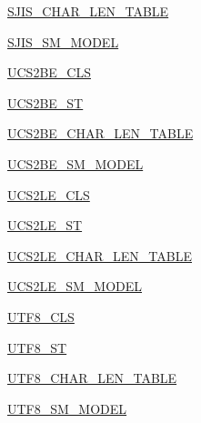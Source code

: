 \begin{DoxyCompactItemize}
\item 
\hyperlink{namespacepip_1_1__vendor_1_1chardet_1_1mbcssm_a4b210c653b5cd1244122fff7ee1a3c84}{S\+J\+I\+S\+\_\+\+C\+H\+A\+R\+\_\+\+L\+E\+N\+\_\+\+T\+A\+B\+LE}
\item 
\hyperlink{namespacepip_1_1__vendor_1_1chardet_1_1mbcssm_a49b66f6f6c37593e145ca2bf89a1dc3a}{S\+J\+I\+S\+\_\+\+S\+M\+\_\+\+M\+O\+D\+EL}
\item 
\hyperlink{namespacepip_1_1__vendor_1_1chardet_1_1mbcssm_a211a0901b4d0287631cb656380dde5c8}{U\+C\+S2\+B\+E\+\_\+\+C\+LS}
\item 
\hyperlink{namespacepip_1_1__vendor_1_1chardet_1_1mbcssm_af051a317c20a30a8e5635a4358c23b79}{U\+C\+S2\+B\+E\+\_\+\+ST}
\item 
\hyperlink{namespacepip_1_1__vendor_1_1chardet_1_1mbcssm_a02a14839f8338acb45bbbcbf9d5d03e1}{U\+C\+S2\+B\+E\+\_\+\+C\+H\+A\+R\+\_\+\+L\+E\+N\+\_\+\+T\+A\+B\+LE}
\item 
\hyperlink{namespacepip_1_1__vendor_1_1chardet_1_1mbcssm_abc91ee1869432d180060766560e91a7a}{U\+C\+S2\+B\+E\+\_\+\+S\+M\+\_\+\+M\+O\+D\+EL}
\item 
\hyperlink{namespacepip_1_1__vendor_1_1chardet_1_1mbcssm_a20af35b8e6ab83bbe931df039eaf190f}{U\+C\+S2\+L\+E\+\_\+\+C\+LS}
\item 
\hyperlink{namespacepip_1_1__vendor_1_1chardet_1_1mbcssm_ac92d38827a1d1313456617714b374ec9}{U\+C\+S2\+L\+E\+\_\+\+ST}
\item 
\hyperlink{namespacepip_1_1__vendor_1_1chardet_1_1mbcssm_adf6a6e9f22b61bc55d19bb0dd95fc6a6}{U\+C\+S2\+L\+E\+\_\+\+C\+H\+A\+R\+\_\+\+L\+E\+N\+\_\+\+T\+A\+B\+LE}
\item 
\hyperlink{namespacepip_1_1__vendor_1_1chardet_1_1mbcssm_a63a3443359af8025c6ce39387f394b3c}{U\+C\+S2\+L\+E\+\_\+\+S\+M\+\_\+\+M\+O\+D\+EL}
\item 
\hyperlink{namespacepip_1_1__vendor_1_1chardet_1_1mbcssm_a53af068791f3403071c9de9992b1fb1e}{U\+T\+F8\+\_\+\+C\+LS}
\item 
\hyperlink{namespacepip_1_1__vendor_1_1chardet_1_1mbcssm_a37f71413844718574c0232a2141e066f}{U\+T\+F8\+\_\+\+ST}
\item 
\hyperlink{namespacepip_1_1__vendor_1_1chardet_1_1mbcssm_aac6c6a68fc6d7f7495b280946e31a598}{U\+T\+F8\+\_\+\+C\+H\+A\+R\+\_\+\+L\+E\+N\+\_\+\+T\+A\+B\+LE}
\item 
\hyperlink{namespacepip_1_1__vendor_1_1chardet_1_1mbcssm_acba797ee678a9147c2859094bd642766}{U\+T\+F8\+\_\+\+S\+M\+\_\+\+M\+O\+D\+EL}
\end{DoxyCompactItemize}


